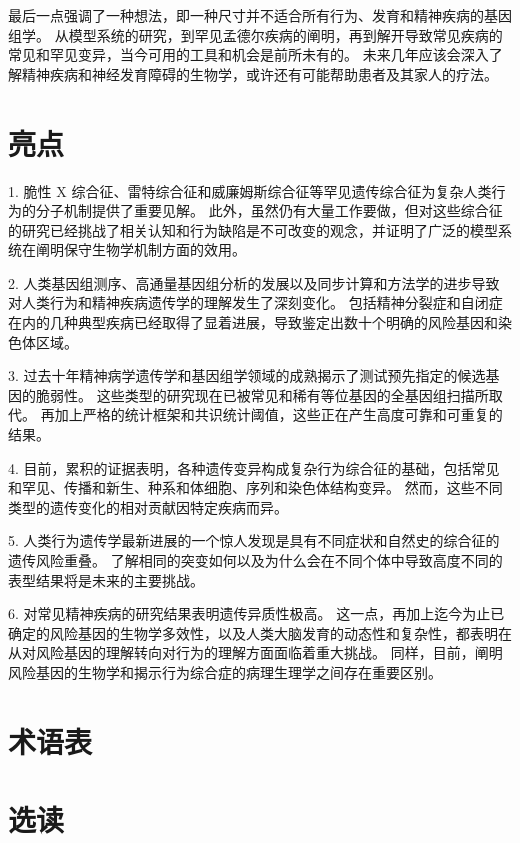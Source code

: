 最后一点强调了一种想法，即一种尺寸并不适合所有行为、发育和精神疾病的基因组学。 从模型系统的研究，到罕见孟德尔疾病的阐明，再到解开导致常见疾病的常见和罕见变异，当今可用的工具和机会是前所未有的。 未来几年应该会深入了解精神疾病和神经发育障碍的生物学，或许还有可能帮助患者及其家人的疗法。

\section{亮点}

1. 脆性 X 综合征、雷特综合征和威廉姆斯综合征等罕见遗传综合征为复杂人类行为的分子机制提供了重要见解。 此外，虽然仍有大量工作要做，但对这些综合征的研究已经挑战了相关认知和行为缺陷是不可改变的观念，并证明了广泛的模型系统在阐明保守生物学机制方面的效用。

2. 人类基因组测序、高通量基因组分析的发展以及同步计算和方法学的进步导致对人类行为和精神疾病遗传学的理解发生了深刻变化。 包括精神分裂症和自闭症在内的几种典型疾病已经取得了显着进展，导致鉴定出数十个明确的风险基因和染色体区域。

3. 过去十年精神病学遗传学和基因组学领域的成熟揭示了测试预先指定的候选基因的脆弱性。 这些类型的研究现在已被常见和稀有等位基因的全基因组扫描所取代。 再加上严格的统计框架和共识统计阈值，这些正在产生高度可靠和可重复的结果。

4. 目前，累积的证据表明，各种遗传变异构成复杂行为综合征的基础，包括常见和罕见、传播和新生、种系和体细胞、序列和染色体结构变异。 然而，这些不同类型的遗传变化的相对贡献因特定疾病而异。

5. 人类行为遗传学最新进展的一个惊人发现是具有不同症状和自然史的综合征的遗传风险重叠。 了解相同的突变如何以及为什么会在不同个体中导致高度不同的表型结果将是未来的主要挑战。

6. 对常见精神疾病的研究结果表明遗传异质性极高。 这一点，再加上迄今为止已确定的风险基因的生物学多效性，以及人类大脑发育的动态性和复杂性，都表明在从对风险基因的理解转向对行为的理解方面面临着重大挑战。 同样，目前，阐明风险基因的生物学和揭示行为综合症的病理生理学之间存在重要区别。

\section{术语表}

\section{选读}




